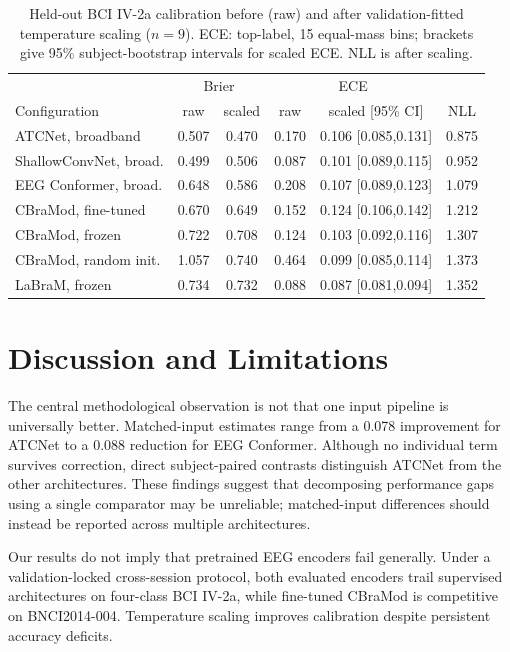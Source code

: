 \documentclass[conference]{IEEEtran}
\begin{document}
\begin{table}[t]
\centering
\caption{Held-out BCI IV-2a calibration before (raw) and after validation-fitted temperature scaling ($n=9$). ECE: top-label, 15 equal-mass bins; brackets give 95\% subject-bootstrap intervals for scaled ECE. NLL is after scaling.}
\label{tab:calib}
\footnotesize
\setlength{\tabcolsep}{2.7pt}
\begin{tabular}{lccccc}
\toprule
 & \multicolumn{2}{c}{Brier} & \multicolumn{2}{c}{ECE} & \\
Configuration & raw & scaled & raw & scaled [95\% CI] & NLL \\
\midrule
ATCNet, broadband     & 0.507 & 0.470 & 0.170 & 0.106 [0.085,0.131] & 0.875 \\
ShallowConvNet, broad. & 0.499 & 0.506 & 0.087 & 0.101 [0.089,0.115] & 0.952 \\
EEG Conformer, broad. & 0.648 & 0.586 & 0.208 & 0.107 [0.089,0.123] & 1.079 \\
CBraMod, fine-tuned   & 0.670 & 0.649 & 0.152 & 0.124 [0.106,0.142] & 1.212 \\
CBraMod, frozen       & 0.722 & 0.708 & 0.124 & 0.103 [0.092,0.116] & 1.307 \\
CBraMod, random init. & 1.057 & 0.740 & 0.464 & 0.099 [0.085,0.114] & 1.373 \\
LaBraM, frozen        & 0.734 & 0.732 & 0.088 & 0.087 [0.081,0.094] & 1.352 \\
\bottomrule
\end{tabular}
\end{table}

\section{Discussion and Limitations}

The central methodological observation is not that one input pipeline is universally better. Matched-input estimates range from a 0.078 improvement for ATCNet to a 0.088 reduction for EEG Conformer. Although no individual term survives correction, direct subject-paired contrasts distinguish ATCNet from the other architectures. These findings suggest that decomposing performance gaps using a single comparator may be unreliable; matched-input differences should instead be reported across multiple architectures.

Our results do not imply that pretrained EEG encoders fail generally. Under a validation-locked cross-session protocol, both evaluated encoders trail supervised architectures on four-class BCI IV-2a, while fine-tuned CBraMod is competitive on BNCI2014-004. Temperature scaling improves calibration despite persistent accuracy deficits.
\end{document}
